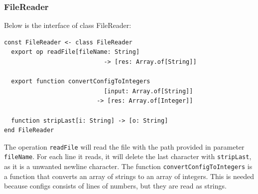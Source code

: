 

\clearpage
\subsubsection{FileReader}
Below is the interface of class FileReader:
\begin{lstlisting}[language=emerald]
const FileReader <- class FileReader
  export op readFile[fileName: String] 
                            -> [res: Array.of[String]]
                            
  export function convertConfigToIntegers
                            [input: Array.of[String]] 
                          -> [res: Array.of[Integer]]
                            
  function stripLast[i: String] -> [o: String]
end FileReader
\end{lstlisting}
The operation \verb|readFile| will read the file with the path provided in parameter \verb|fileName|. For each line it reads, it will delete the last character with \verb|stripLast|, as it is a unwanted newline character. The function \verb|convertConfigToIntegers| is a function that converts an array of strings to an array of integers. This is needed because configs consists of lines of numbers, but they are read as strings.



